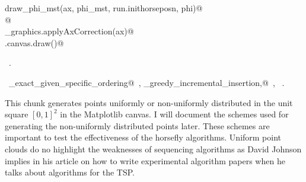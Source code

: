 \documentclass[11.5pt]{report}
\begin{document}
\begin{flushleft}
\begin{list}{}{}
\mbox{}\verb@     draw_phi_mst(ax, phi_mst, run.inithorseposn, phi)@\\
\mbox{}\verb@     @\\
\mbox{}\verb@utils_graphics.applyAxCorrection(ax)@\\
\mbox{}\verb@fig.canvas.draw()@\\
\mbox{}\verb@@{\NWsep}
\end{list}
\vspace{-1.5ex}
\footnotesize
\begin{list}{}{\setlength{\itemsep}{-\parsep}\setlength{\itemindent}{-\leftmargin}}
\item \NWtxtMacroRefIn\ .
\item \NWtxtIdentsUsed\nobreak\  \verb@algo_exact_given_specific_ordering@\nobreak\ , \verb@algo_greedy_incremental_insertion,@\nobreak\ , \verb@plotTour@\nobreak\ .
\item{}
\end{list}
\vspace{4ex}
\end{flushleft}

\vspace{-0.8cm}\newchunk This chunk generates points uniformly or non-uniformly distributed in the 
unit square $[0,1]^2$ in the Matplotlib canvas. I will document the schemes used for 
generating the non-uniformly distributed points later. These schemes are important to test the effectiveness of 
the horsefly algorithms. Uniform point clouds do no highlight the weaknesses of 
sequencing algorithms as David Johnson implies in his article on how to write 
experimental algorithm papers when he talks about algorithms for the TSP. 
\end{document}

